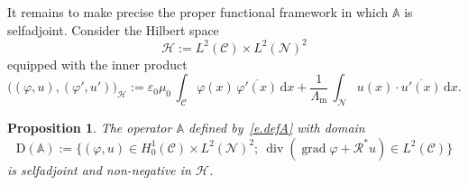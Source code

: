 \documentclass[11pt]{article}
\newtheorem{prop}[theo]{Proposition}
\theoremstyle{definition}
\numberwithin{equation}{section}
\numberwithin{figure}{section}
\numberwithin{table}{section}
\DeclareMathOperator{\Div}{div}
\DeclareMathOperator{\grad}{grad}
\newcommand{\epsl}{\varepsilon}
\newcommand{\calC}{\mathcal{C}}
\newcommand{\calH}{\mathcal{H}}
\newcommand{\calN}{\mathcal{N}}
\newcommand{\calR}{\mathcal{R}}
\newcommand{\bbA}{\mathbb{A}}
\newcommand{\rmd}{{\mathrm{d}}}
\newcommand{\rmD}{{\mathrm{D}}}
\newcommand{\Lm}{{\Lambda_{\mathrm{m}}}}
\begin{document}
It remains to make precise the proper functional framework in which $\bbA$ is selfadjoint. Consider the Hilbert space
\[
\calH := L^2(\calC) \times L^2(\calN)^2
\]
equipped with the inner product
\begin{equation}\label{e.def-inner-prod}
\Big((\varphi,u), (\varphi',u') \Big)_\calH :=
\epsl_0 \mu_0 \, \int_\calC \varphi(x) \, \overline{\varphi'(x)} \,\rmd x + \frac{1}{\Lm} \, \int_\calN u(x) \cdot \overline{u'(x)} \,\rmd x.
\end{equation}

\begin{prop}
The operator $\bbA$ defined by~\eqref{e.defA} with domain
\begin{equation}\label{e.def-Dom-A}
\rmD(\bbA) := \Big\{ (\varphi,u) \in H^1_0(\calC) \times L^2(\calN)^2; \
\Div(\grad \varphi + \calR^* u) \in L^2(\calC) \Big\}
\end{equation}
is selfadjoint and non-negative in $\calH$.\label{p.A-selfadjoint}
\end{prop}
\end{document}
